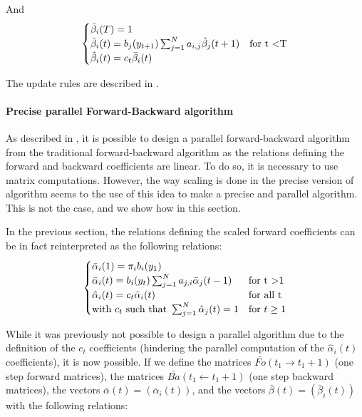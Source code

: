 And
\begin{equation}
\begin{cases}
\bar{\beta}_i(T) = 1 & \\
\bar{\beta}_i(t) = b_j(y_{t+1})\sum_{j=1}^{N}{a_{i,j}\hat{\beta}_j(t+1)} & \text{for t \textless T} \\
\hat{\beta}_i(t) = c_t \bar{\beta}_i(t)
\end{cases}
\end{equation}

The update rules are described in \cite{rabiner1989tutorial}.

\paragraph{Precise parallel Forward-Backward algorithm}
As described in \cite{turin1998unidirectional}, it is possible to design a parallel forward-backward algorithm from the traditional forward-backward algorithm as the relations defining the forward and backward coefficients are linear. To do so, it is necessary to use matrix computations. However, the way scaling is done in the precise version of algorithm seems to the use of this idea to make a precise and parallel algorithm. This is not the case, and we show how in this section.

In the previous section, the relations defining the scaled forward coefficients can be in fact reinterpreted as the following relations:
\begin{equation}
\begin{cases}
\bar{\alpha}_i(1) = \pi_i b_i(y_1) & \\
\bar{\alpha}_i(t) = b_i(y_t)\sum_{j=1}^{N}{a_{j,i}\bar{\alpha}_j(t-1)} & \text{for t \textgreater 1} \\
\hat{\alpha}_i(t) = c_t \bar{\alpha}_i(t) & \text{for all t} \\
\text{with } c_t \text{ such that } \sum_{j=1}^{N}{\hat{\alpha}_j(t)} = 1 & \text{for }t \ge 1
\end{cases}
\end{equation}

While it was previously not possible to design a parallel algorithm due to the definition of the $c_t$ coefficients (hindering the parallel computation of the $\hat{\alpha}_i(t)$ coefficients), it is now possible.
If we define the matrices $\bar{Fo}(t_1 \rightarrow t_1 + 1)$ (one step forward matrices), the matrices $\bar{Ba}( t_1 \leftarrow t_1 + 1)$ (one step backward matrices), the vectors $\bar{\alpha}(t)=(\bar{\alpha}_i(t))$, and the vectors $\bar{\beta}(t)=(\bar{\beta}_i(t))$ with the following relations:

